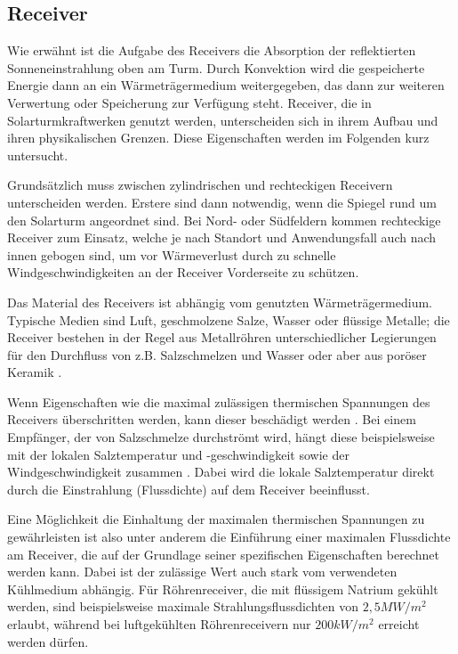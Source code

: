 \subsection{Receiver} \label{subsec_Receiver}

Wie erwähnt ist die Aufgabe des Receivers die Absorption der reflektierten Sonneneinstrahlung oben am Turm.
Durch Konvektion wird die gespeicherte Energie dann an ein Wärmeträgermedium weitergegeben, das dann zur weiteren Verwertung oder Speicherung zur Verfügung steht.
Receiver, die in Solarturmkraftwerken genutzt werden, unterscheiden sich in ihrem Aufbau und ihren physikalischen Grenzen. Diese Eigenschaften werden im Folgenden kurz untersucht.

Grundsätzlich muss zwischen zylindrischen und rechteckigen Receivern unterscheiden werden.
Erstere sind dann notwendig, wenn die Spiegel rund um den Solarturm angeordnet sind. Bei Nord- oder Südfeldern kommen rechteckige Receiver zum Einsatz, welche je nach Standort und Anwendungsfall auch nach innen gebogen sind, um vor Wärmeverlust durch zu schnelle Windgeschwindigkeiten an der Receiver Vorderseite zu schützen. \cite{Flesch}

Das Material des Receivers ist abhängig vom genutzten Wärmeträgermedium.
Typische Medien sind Luft, geschmolzene Salze, Wasser oder flüssige Metalle; die Receiver bestehen in der Regel aus Metallröhren unterschiedlicher Legierungen für den Durchfluss von z.B. Salzschmelzen und Wasser oder aber aus poröser Keramik \cite{Barlev}\cite{Ho2017}.

Wenn Eigenschaften wie die maximal zulässigen thermischen Spannungen des Receivers überschritten werden, kann dieser beschädigt werden \cite{AlbertoSanchez}.
Bei einem Empfänger, der von Salzschmelze durchströmt wird, hängt diese beispielsweise mit der lokalen Salztemperatur und -geschwindigkeit
sowie der Windgeschwindigkeit zusammen \cite{VantHull}.
Dabei wird die lokale Salztemperatur direkt durch die Einstrahlung (Flussdichte) auf dem Receiver beeinflusst.

Eine Möglichkeit die Einhaltung der maximalen thermischen Spannungen zu gewährleisten ist also unter anderem die Einführung einer maximalen Flussdichte am Receiver, die auf der Grundlage seiner spezifischen Eigenschaften berechnet werden kann.
Dabei ist der zulässige Wert auch stark vom verwendeten Kühlmedium abhängig.
Für Röhrenreceiver, die mit flüssigem Natrium gekühlt werden, sind beispielsweise maximale Strahlungsflussdichten von $2,5MW/m^2$ erlaubt, während bei luftgekühlten Röhrenreceivern nur $200kW/m^2$ \cite[S. 17]{DissBelhomme} erreicht werden dürfen.

